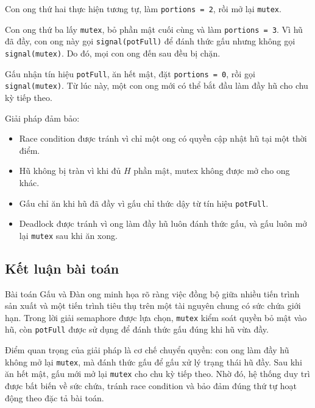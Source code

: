 Con ong thứ hai thực hiện tương tự, làm \texttt{portions = 2}, rồi mở
lại \texttt{mutex}.

Con ong thứ ba lấy \texttt{mutex}, bỏ phần mật cuối cùng và làm
\texttt{portions = 3}. Vì hũ đã đầy, con ong này gọi
\texttt{signal(potFull)} để đánh thức gấu nhưng không gọi
\texttt{signal(mutex)}. Do đó, mọi con ong đến sau đều bị chặn.

Gấu nhận tín hiệu \texttt{potFull}, ăn hết mật, đặt
\texttt{portions = 0}, rồi gọi \texttt{signal(mutex)}. Từ lúc này, một
con ong mới có thể bắt đầu làm đầy hũ cho chu kỳ tiếp theo.

Giải pháp đảm bảo:

\begin{itemize}
\item Race condition được tránh vì chỉ một ong có quyền cập nhật hũ
tại một thời điểm.
\item Hũ không bị tràn vì khi đủ $H$ phần mật, mutex không được mở
cho ong khác.
\item Gấu chỉ ăn khi hũ đã đầy vì gấu chỉ thức dậy từ tín hiệu
\texttt{potFull}.
\item Deadlock được tránh vì ong làm đầy hũ luôn đánh thức gấu, và
gấu luôn mở lại \texttt{mutex} sau khi ăn xong.
\end{itemize}

\subsection{Kết luận bài toán}

Bài toán Gấu và Đàn ong minh họa rõ ràng việc đồng bộ giữa nhiều tiến
trình sản xuất và một tiến trình tiêu thụ trên một tài nguyên chung có
sức chứa giới hạn. Trong lời giải semaphore được lựa chọn,
\texttt{mutex} kiểm soát quyền bỏ mật vào hũ, còn
\texttt{potFull} được sử dụng để đánh thức gấu đúng khi hũ vừa đầy.

Điểm quan trọng của giải pháp là cơ chế chuyển quyền: con ong làm đầy
hũ không mở lại \texttt{mutex}, mà đánh thức gấu để gấu xử lý trạng thái
hũ đầy. Sau khi ăn hết mật, gấu mới mở lại \texttt{mutex} cho chu kỳ
tiếp theo. Nhờ đó, hệ thống duy trì được bất biến về sức chứa, tránh
race condition và bảo đảm đúng thứ tự hoạt động theo đặc tả bài toán.


